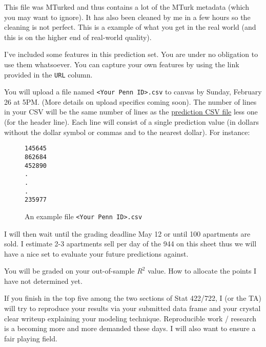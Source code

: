 \documentclass[12pt]{article}
\begin{document}
This file was MTurked and thus contains a lot of the MTurk metadata (which you may want to ignore). It has also been cleaned by me in a few hours so the cleaning is not perfect. This is a example of what you get in the real world (and this is on the higher end of real-world quality).

I've included some features in this prediction set. You are under no obligation to use them whatsoever. You can capture your own features by using the link provided in the \texttt{URL} column.

You will upload a file named \texttt{<Your Penn ID>.csv} to canvas by Sunday, February 26 at 5PM. (More details on upload specifics coming soon). The number of lines in your CSV will be the same number of lines as the \href{https://raw.githubusercontent.com/kapelner/Wharton_Stat_422_722/master/assignments/project/stat_422_722_project_prediction_set.csv}{prediction CSV file} less one (for the header line). Each line will consist of a single prediction value (in dollars without the dollar symbol or commas and to the nearest dollar). For instance:

\begin{figure}[htp]
\begin{Verbatim}[frame=single, fontsize = \small]
145645
862684
452890
.
.
.
235977
\end{Verbatim}
\caption{An example file \texttt{<Your Penn ID>.csv}}
\end{figure}

I will then wait until the grading deadline May 12 or until 100 apartments are sold. I estimate 2-3 apartments sell per day of the 944 on this sheet thus we will have a nice set to evaluate your future predictions against.

You will be graded on your out-of-sample $R^2$ value. How to allocate the points I have not determined yet.

If you finish in the top five among the two sections of Stat 422/722, I (or the TA) will try to reproduce your results via your submitted data frame and your crystal clear writeup explaining your modeling technique. Reproducible work / research is a becoming more and more demanded these days. I will also want to ensure a fair playing field.
\end{document}
